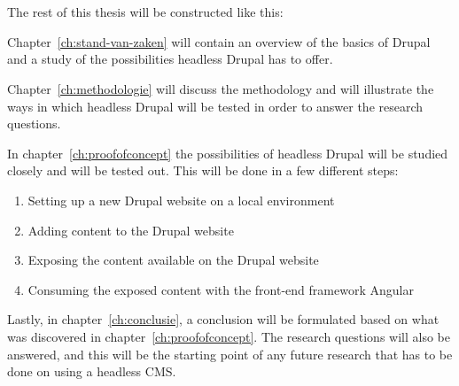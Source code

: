 \section{}
\label{sec:opzet-bachelorproef}


The rest of this thesis will be constructed like this:

Chapter~\ref{ch:stand-van-zaken} will contain an overview of the basics of Drupal and a study of the possibilities headless Drupal has to offer.

Chapter~\ref{ch:methodologie} will discuss the methodology and will illustrate the ways in which headless Drupal will be tested in order to answer the research questions.

In chapter~\ref{ch:proofofconcept} the possibilities of headless Drupal will be studied closely and will be tested out. This will be done in a few different steps:

\begin{enumerate}
	\item Setting up a new Drupal website on a local environment
	\item Adding content to the Drupal website
	\item Exposing the content available on the Drupal website
	\item Consuming the exposed content with the front-end framework Angular
\end{enumerate}


Lastly, in chapter~\ref{ch:conclusie}, a conclusion will be formulated based on what was discovered in chapter~\ref{ch:proofofconcept}. The research questions will also be answered, and this will be the starting point of any future research that has to be done on using a headless CMS.
